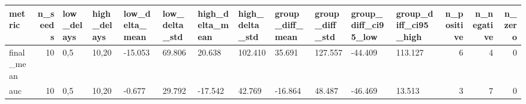 \begin{tabular}{lrllllllllllrrr}
\toprule
metric & n_seeds & low_delays & high_delays & low_delta_mean & low_delta_std & high_delta_mean & high_delta_std & group_diff_mean & group_diff_std & group_diff_ci95_low & group_diff_ci95_high & n_positive & n_negative & n_zero \\
\midrule
final_mean & 10 & 0,5 & 10,20 & -15.053 & 69.806 & 20.638 & 102.410 & 35.691 & 127.557 & -44.409 & 113.127 & 6 & 4 & 0 \\
auc & 10 & 0,5 & 10,20 & -0.677 & 29.792 & -17.542 & 42.769 & -16.864 & 48.487 & -46.469 & 13.513 & 3 & 7 & 0 \\
\bottomrule
\end{tabular}
